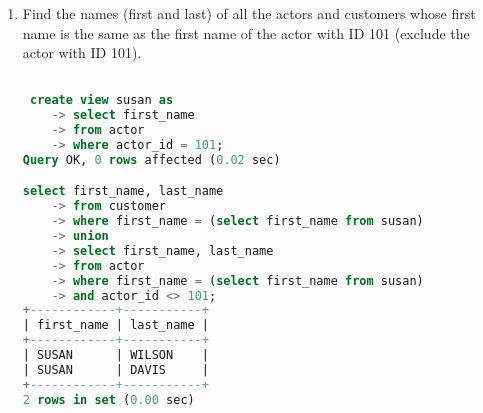 \documentclass[12pt]{article}
\begin{document}
\begin{enumerate}
\begin{lstlisting}[language=SQL]
\end{lstlisting}


\item Find the names (first and last) of all the actors and customers whose first name is the same as the first name of the actor with ID 101 (exclude the actor with ID 101).


\begin{lstlisting}[language=SQL]

 create view susan as
    -> select first_name
    -> from actor
    -> where actor_id = 101;
Query OK, 0 rows affected (0.02 sec)

select first_name, last_name
    -> from customer
    -> where first_name = (select first_name from susan)
    -> union 
    -> select first_name, last_name
    -> from actor
    -> where first_name = (select first_name from susan)
    -> and actor_id <> 101;
+------------+-----------+
| first_name | last_name |
+------------+-----------+
| SUSAN      | WILSON    |
| SUSAN      | DAVIS     |
+------------+-----------+
2 rows in set (0.00 sec)


\end{lstlisting}


\end{enumerate}



 
\end{document}
